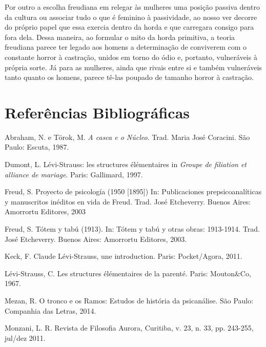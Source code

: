 Por outro a escolha freudiana em relegar às mulheres uma posição passiva
dentro da cultura ou associar tudo o que é feminino à passividade, ao
nosso ver decorre do próprio papel que essa exercia dentro da horda e
que carregara consigo para fora dela. Dessa maneira, ao formular o mito
da horda primitiva, a teoria freudiana parece ter legado aos homens a
determinação de conviverem com o constante horror à castração, unidos em
torno do ódio e, portanto, vulneráveis à própria sorte. Já para as
mulheres, ainda que rivais entre si e também vulneráveis tanto quanto os
homens, parece tê-las poupado de tamanho horror à castração.

\section{Referências Bibliográficas}

Abraham, N. e Törok, M. \emph{A casca e o Núcleo}. Trad. Maria José
Coracini. São Paulo: Escuta, 1987.

Dumont, L. Lévi-Strauss: les structures élémentaires in \emph{Groupe de
filiation et alliance de mariage}. Paris: Gallimard, 1997.

Freud, S. Proyecto de psicología (1950 {[}1895{]}) In: Publicaciones
prepsicoanalíticas y manuscritos inéditos en vida de Freud. Trad. José
Etcheverry. Buenos Aires: Amorrortu Editores, 2003

Freud, S. Tótem y tabú (1913). In: Tótem y tabú y otras obras:
1913-1914. Trad. José Etcheverry. Buenos Aires: Amorrortu Editores,
2003.

Keck, F. Claude Lévi-Strauss, une introduction. Paris:
Pocket/Agora, 2011.

Lévi-Strauss, C. Les structures élémentaires de la parenté. Paris:
Mouton\&Co, 1967.

Mezan, R. O tronco e os Ramos: Estudos de história da psicanálise. São
Paulo: Companhia das Letras, 2014.

Monzani, L. R. Revista de Filosofia Aurora, Curitiba, v. 23, n. 33, pp.
243-255, jul/dez 2011.
